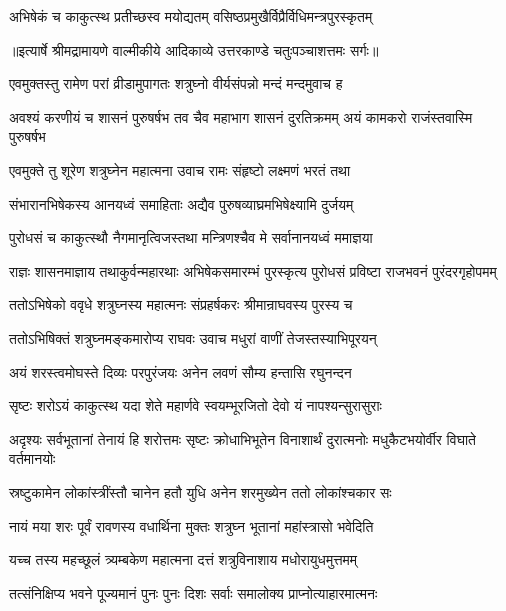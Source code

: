 \twolineshloka
{अभिषेकं च काकुत्स्थ प्रतीच्छस्व मयोद्यतम्}
{वसिष्ठप्रमुखैर्विप्रैर्विधिमन्त्रपुरस्कृतम्} %


{॥इत्यार्षे श्रीमद्रामायणे वाल्मीकीये आदिकाव्ये उत्तरकाण्डे चतुःपञ्चाशत्तमः सर्गः॥}


\twolineshloka
{एवमुक्तस्तु रामेण परां व्रीडामुपागतः}
{शत्रुघ्नो वीर्यसंपन्नो मन्दं मन्दमुवाच ह} %

\threelineshloka
{अवश्यं करणीयं च शासनं पुरुषर्षभ}
{तव चैव महाभाग शासनं दुरतिक्रमम्}
{अयं कामकरो राजंस्तवास्मि पुरुषर्षभ} %

\twolineshloka
{एवमुक्ते तु शूरेण शत्रुघ्नेन महात्मना}
{उवाच रामः संहृष्टो लक्ष्मणं भरतं तथा} %

\twolineshloka
{संभारानभिषेकस्य आनयध्वं समाहिताः}
{अद्यैव पुरुषव्याघ्रमभिषेक्ष्यामि दुर्जयम्} %

\twolineshloka
{पुरोधसं च काकुत्स्थौ नैगमानृत्विजस्तथा}
{मन्त्रिणश्चैव मे सर्वानानयध्वं ममाज्ञया} %

\threelineshloka
{राज्ञः शासनमाज्ञाय तथाकुर्वन्महारथाः}
{अभिषेकसमारम्भं पुरस्कृत्य पुरोधसं}
{प्रविष्टा राजभवनं पुरंदरगृहोपमम्} %

\twolineshloka
{ततोऽभिषेको ववृधे शत्रुघ्नस्य महात्मनः}
{संप्रहर्षकरः श्रीमान्राघवस्य पुरस्य च} %

\twolineshloka
{ततोऽभिषिक्तं शत्रुघ्नमङ्कमारोप्य राघवः}
{उवाच मधुरां वाणीं तेजस्तस्याभिपूरयन्} %

\twolineshloka
{अयं शरस्त्वमोघस्ते दिव्यः परपुरंजयः}
{अनेन लवणं सौम्य हन्तासि रघुनन्दन} %

\twolineshloka
{सृष्टः शरोऽयं काकुत्स्थ यदा शेते महार्णवे}
{स्वयम्भूरजितो देवो यं नापश्यन्सुरासुराः} %

\threelineshloka
{अदृश्यः सर्वभूतानां तेनायं हि शरोत्तमः}
{सृष्टः क्रोधाभिभूतेन विनाशार्थं दुरात्मनोः}
{मधुकैटभयोर्वीर विघाते वर्तमानयोः} %

\twolineshloka
{स्रष्टुकामेन लोकांस्त्रींस्तौ चानेन हतौ युधि}
{अनेन शरमुख्येन ततो लोकांश्चकार सः} %

\twolineshloka
{नायं मया शरः पूर्वं रावणस्य वधार्थिना}
{मुक्तः शत्रुघ्न भूतानां महांस्त्रासो भवेदिति} %

\twolineshloka
{यच्च तस्य महच्छूलं त्र्यम्बकेण महात्मना}
{दत्तं शत्रुविनाशाय मधोरायुधमुत्तमम्} %

\twolineshloka
{तत्संनिक्षिप्य भवने पूज्यमानं पुनः पुनः}
{दिशः सर्वाः समालोक्य प्राप्नोत्याहारमात्मनः} %

